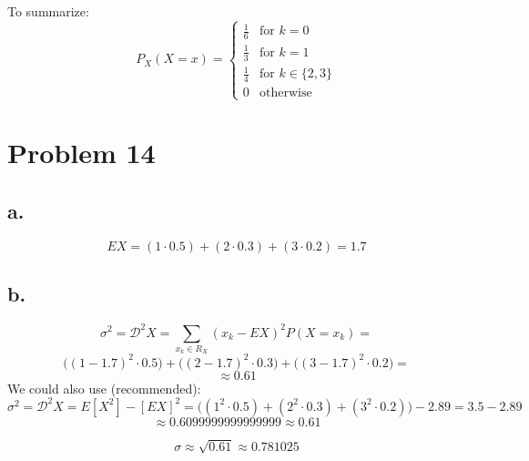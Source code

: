 \documentclass{article}
\begin{document}
To summarize:
\begin{equation*}
    P_{X}(X = x) =
    \begin{cases}
        \frac{1}{6}  & \mbox{for \(k = 0\)} \\
        \frac{1}{3}  & \mbox{for \(k = 1\)} \\
        \frac{1}{4}  & \mbox{for \(k \in \{2, 3\}\)} \\
        0 & \mbox{otherwise} 
    \end{cases}
\end{equation*}

\section*{Problem 14}

\subsection*{a.}
\begin{equation*}
    EX = (1 \cdot 0.5) + (2 \cdot 0.3) + (3 \cdot 0.2) = 1.7
\end{equation*}

\subsection*{b.}

\begin{equation*}
    \sigma^{2} = \mathcal{D}^{2}X = \sum_{x_{k} \in R_{X}}(x_{k} - EX)^{2}P(X=x_{k}) = 
\end{equation*}
\begin{equation*}
    \Big((1 - 1.7)^{2} \cdot 0.5 \Big) + \Big((2 - 1.7)^{2} \cdot 0.3 \Big) + \Big((3 - 1.7)^{2} \cdot 0.2 \Big) =
\end{equation*}
\begin{equation*}
    \approx 0.61
\end{equation*}
We could also use (recommended):
\begin{equation*}
    \sigma^{2} = \mathcal{D}^{2}X = E[X^{2}]- [EX]^{2} = \Big((1^{2} \cdot 0.5) + (2^{2} \cdot 0.3) + (3^{2} \cdot 0.2)\Big) - 2.89 = 3.5 - 2.89
\end{equation*}
\begin{equation*}
    \approx 0.6099999999999999 \approx 0.61
\end{equation*}

\begin{equation*}
    \sigma \approx \sqrt{0.61} \approx 0.781025
\end{equation*}
\end{document}
